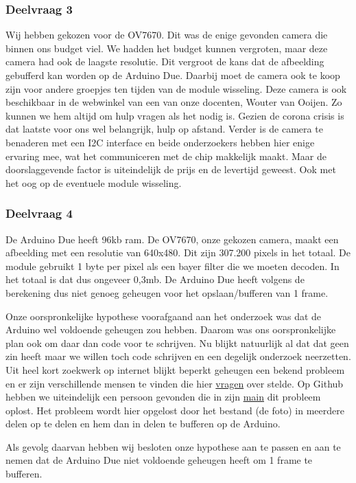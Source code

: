 \documentclass{article}
\begin{document}
\subsubsection{Deelvraag 3}
Wij hebben gekozen voor de OV7670. Dit was de enige gevonden camera die binnen ons budget viel. We hadden het budget kunnen vergroten, maar deze camera had ook de laagste resolutie. Dit vergroot de kans dat de afbeelding gebufferd kan worden op de Arduino Due. Daarbij moet de camera ook te koop zijn voor andere groepjes ten tijden van de module wisseling.  Deze camera is ook beschikbaar in de webwinkel van een van onze docenten, Wouter van Ooijen. Zo kunnen we hem altijd om hulp vragen als het nodig is. Gezien de corona crisis is dat laatste voor ons wel belangrijk, hulp op afstand. Verder is de camera te benaderen met een I2C interface en beide onderzoekers hebben hier enige ervaring mee, wat het communiceren met de chip makkelijk maakt. Maar de doorslaggevende factor is uiteindelijk de prijs en de levertijd geweest. Ook met het oog op de eventuele module wisseling.

\subsubsection{Deelvraag 4}
De Arduino Due heeft 96kb ram. De OV7670, onze gekozen camera, maakt een afbeelding met een resolutie van 640x480. Dit zijn 307.200 pixels in het totaal. De module gebruikt 1 byte per pixel als een bayer filter die we moeten decoden. In het totaal is dat dus ongeveer 0,3mb. De Arduino Due heeft volgens de berekening dus niet genoeg geheugen voor het opslaan/bufferen van 1 frame.

Onze oorspronkelijke hypothese voorafgaand aan het onderzoek was dat de Arduino wel voldoende geheugen zou hebben. Daarom was ons oorspronkelijke plan ook om daar dan code voor te schrijven. Nu blijkt natuurlijk al dat dat geen zin heeft maar we willen toch code schrijven en een degelijk onderzoek neerzetten.
Uit heel kort zoekwerk op internet blijkt beperkt geheugen een bekend probleem en er zijn verschillende mensen te vinden die hier \href{https://forum.arduino.cc/index.php?topic=159557.0}{vragen} over stelde. Op Github hebben we uiteindelijk een persoon gevonden die in zijn \href{https://github.com/ComputerNerd/ov7670-simple/blob/master/main.c}{main} dit probleem oplost. Het probleem wordt hier opgelost door het bestand (de foto) in meerdere delen op te delen en hem dan in delen te bufferen op de Arduino.

Als gevolg daarvan hebben wij besloten onze hypothese aan te passen en aan te nemen dat de Arduino Due niet voldoende geheugen heeft om 1 frame te bufferen.
\end{document}
